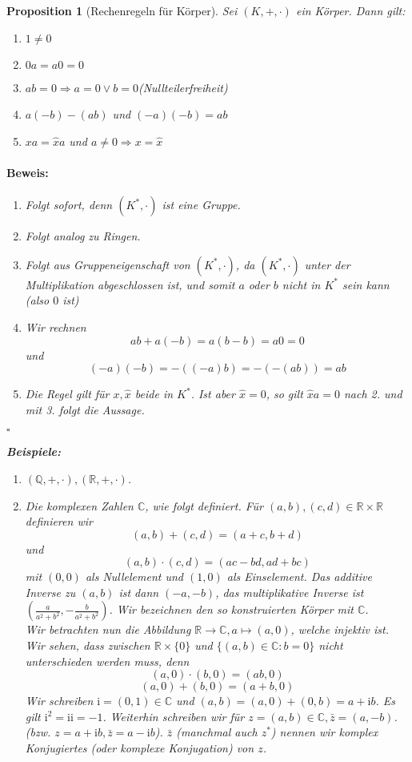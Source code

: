 \documentclass{report}
\newcommand{\IN}[1]{\index{#1|BH}}
\newcommand{\ii}{\mathrm{i}}
\newcommand{\R}{\mathbb{R}}
\newcommand{\Q}{\mathbb{Q}}
\newcommand{\C}{\mathbb{C}}
\theoremstyle{customrem}
\theoremstyle{customdef}
\newtheorem{prop}[definition]{Proposition}
\renewenvironment{proof}{\vspace{-.75cm}\paragraph{Beweis: }}{\vspace{-.5cm}\hfill$\square$}
\begin{document}
	\begin{prop}[Rechenregeln für Körper]
		Sei $(K, +, \cdot)$ ein Körper. Dann gilt:
		\begin{enumerate}[leftmargin = 4cm, rightmargin = 2cm]
			\itemsep0cm
			\item $1 \neq 0$
			\item $0a = a0 = 0$
			\item $ab = 0 \Rightarrow a = 0 \lor b = 0$\hfill (Nullteilerfreiheit)
			\item $a(-b) -(ab)$ und $(-a)(-b) = ab$
			\item $x a = \hat{x}a$ und $a \neq 0 \Rightarrow x = \hat{x}$
		\end{enumerate}
		\begin{proof}
			\begin{enumerate}
				\item Folgt sofort, denn $(K^\ast, \cdot)$ ist eine Gruppe.
				\item Folgt analog zu Ringen.
				\item Folgt aus Gruppeneigenschaft von $(K^*, \cdot)$, da $(K^*, \cdot)$ unter der Multiplikation abgeschlossen ist, und somit $a$ oder $b$ nicht in $K^\ast$ sein kann (also $0$ ist)
				\item Wir rechnen 
					$$ab + a(-b) = a (b - b) = a 0 = 0$$
					und
					$$(-a)(-b) = -((-a)b) = -(-(ab)) = ab$$
				\item Die Regel gilt für $x, \hat{x}$ beide in $K^\ast$. Ist aber $\hat{x} = 0$, so gilt $\hat{x}a = 0$ nach 2. und mit 3. folgt die Aussage.
			\end{enumerate}
		\end{proof}
		
		
		\noindent\textbf{Beispiele:}
		\begin{enumerate}
			\item$(\Q, +, \cdot), (\R, +, \cdot)$.
			\item \IN{Zahlen!Komplexe}
				Die komplexen Zahlen $\C$, wie folgt definiert. Für $(a, b), (c, d) \in \R \times \R$ definieren wir
				$$(a, b)+(c, d) = (a + c, b + d)$$ und
				$$(a,b)\cdot (c,d) = (ac-bd, ad + bc)$$
				mit $(0, 0)$ als Nullelement und $(1, 0)$ als Einselement. Das additive Inverse zu $(a, b)$ ist dann $(-a, -b)$, das multiplikative Inverse ist $\left(\frac{a}{a^2+b^2}, -\frac{b}{a^2 + b^2}\right)$. Wir bezeichnen den so konstruierten Körper mit $\C$.\\
				
				Wir betrachten nun die Abbildung $\R \to \C, a \mapsto (a, 0)$, welche injektiv ist. Wir sehen, dass zwischen $\R \times \{0\}$ und $\{(a, b) \in \C : b = 0\}$ nicht unterschieden werden muss, denn 
				$$(a, 0)\cdot(b, 0) = (ab, 0)$$
				$$(a, 0) + (b, 0) =  (a+b, 0)$$
				Wir schreiben $\ii = (0, 1) \in \C$ und $(a, b) = (a, 0) + (0, b) = a + \ii b$. Es gilt $\ii^2 = \ii\ii = -1$. Weiterhin schreiben wir  für $z = (a, b) \in \C, \bar{z} = (a, -b)$. (bzw. $z = a + \ii b, \bar{z} = a - \ii b$). $\bar{z}$ (manchmal auch $z^\ast$) nennen wir komplex Konjugiertes (oder komplexe Konjugation) von $z$.\\
				

\end{enumerate}
\end{prop}
\end{document}
